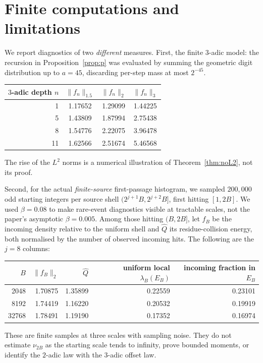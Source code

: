 \documentclass[10pt]{amsart}
\theoremstyle{definition}\newtheorem{definition}[theorem]{Definition}
\theoremstyle{remark}\newtheorem{remark}[theorem]{Remark}
\begin{document}
\section{Finite computations and limitations}
We report diagnostics of two \emph{different} measures. First, the finite $3$-adic model: the recursion in Proposition~\ref{prop:p} was evaluated by summing the geometric digit distribution up to $a=45$, discarding per-step mass at most $2^{-45}$.
\begin{center}
\begin{tabular}{rccc}
\toprule
$3$-adic depth $n$ & $\|f_n\|_{1.5}$ & $\|f_n\|_2$ & $\|f_n\|_3$\\
\midrule
1 &1.17652&1.29099&1.44225\\
5 &1.43809&1.87994&2.75438\\
8 &1.54776&2.22075&3.96478\\
11 &1.62566&2.51674&5.46568\\
\bottomrule
\end{tabular}
\end{center}
The rise of the $L^2$ norms is a numerical illustration of Theorem~\ref{thm:noL2}, not its proof.

Second, for the actual \emph{finite-source} first-passage histogram, we sampled $200{,}000$ odd starting integers per source shell $(2^{j+1}B,2^{j+2}B]$, first hitting $[1,2B]$. We used $\beta=0.08$ to make rare-event diagnostics visible at tractable scales, not the paper's asymptotic $\beta=0.005$. Among those hitting $(B,2B]$, let $f_B$ be the incoming density relative to the uniform shell and $\widehat Q$ its residue-collision energy, both normalised by the number of observed incoming hits. The following are the $j=8$ columns:
\begin{center}
\begin{tabular}{rrrrr}
\toprule
$B$ & $\|f_B\|_2$ & $\widehat Q$ & uniform local $\lambda_B(E_B)$ & incoming fraction in $E_B$\\
\midrule
2048 &1.70875&1.35899&0.22559&0.23101\\
8192 &1.74419&1.16220&0.20532&0.19919\\
32768&1.78491&1.19190&0.17352&0.16974\\
\bottomrule
\end{tabular}
\end{center}
These are finite samples at three scales with sampling noise. They do not estimate $\nu_{2B}$ as the starting scale tends to infinity, prove bounded moments, or identify the $2$-adic law with the $3$-adic offset law.
\end{document}
